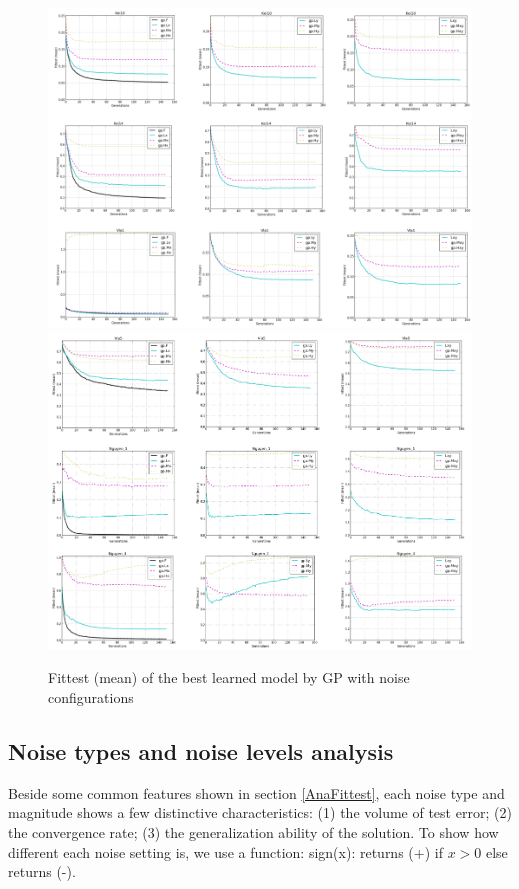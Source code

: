 \begin{figure}
  \includegraphics[width=1.0\textwidth]{Figures/Figure7.png}
  \includegraphics[width=1.0\textwidth]{Figures/Figure8.png}
\caption{Fittest (mean) of the best learned model by GP with noise configurations}
\label{fig:Fittest}       %
\end{figure}


\subsection {Noise types and noise levels analysis}
\label{AnaDiff}
Beside some common features shown in section \ref{AnaFittest}, each noise type and magnitude shows a few distinctive characteristics: (1) the volume of test error; (2) the convergence rate; (3) the generalization ability of the solution. To show how different each noise setting is, we use a function: sign(x): returns (+) if $x>0$ else returns (-).


